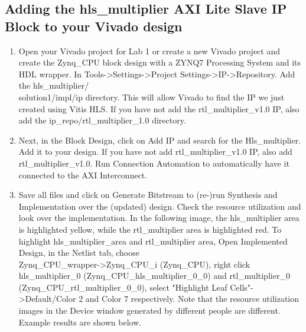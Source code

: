 \documentclass[a4paper,12pt,twoside]{article}
\begin{document}
\subsection{Adding the hls\_multiplier AXI Lite Slave IP Block to your Vivado design}
\begin{enumerate}
    \item Open your Vivado project for Lab 1 or create a new Vivado project and create the Zynq\_CPU block design with a ZYNQ7 Processing System and its HDL wrapper. In Tools->Settings->Project Settings->IP->Repository. Add the hls\_multiplier/\\
    solution1/impl/ip directory. This will allow Vivado to find the IP we just created using Vitis HLS. If you have not add the rtl\_multiplier\_v1.0 IP, also add the ip\_repo/rtl\_multiplier\_1.0 directory.
    \item Next, in the Block Design, click on Add IP and search for the Hls\_multiplier. Add it to your design. If you have not add rtl\_multiplier\_v1.0 IP, also add rtl\_multiplier\_v1.0. Run Connection Automation to automatically have it connected to the AXI Interconnect.
    \item Save all files and click on Generate Bitstream to (re-)run Synthesis and Implementation over the (updated) design. Check the resource utilization and look over the implementation. In the following image, the hls\_multiplier area is highlighted yellow, while the rtl\_multiplier area is highlighted red. To highlight hls\_multiplier\_area and rtl\_multiplier area, Open Implemented Design, in the Netlist tab, choose\\
    Zynq\_CPU\_wrapper->Zynq\_CPU\_i (Zynq\_CPU), right click hls\_multiplier\_0 (Zynq\_CPU\_hls\_multiplier\_0\_0) and rtl\_multiplier\_0 (Zynq\_CPU\_rtl\_multiplier\_0\_0), select "Highlight Leaf Cells"->Default/Color 2 and Color 7 respectively. Note that the resource utilization images in the Device window generated by different people are different. Example results are shown below.
    \begin{figure}[H]
        \centering

\end{figure}
\end{enumerate}
\end{document}
